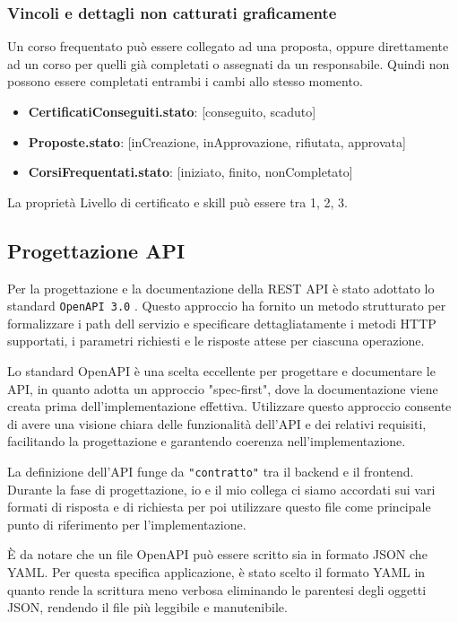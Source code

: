 \FloatBarrier

\subsubsection{Vincoli e dettagli non catturati graficamente}

Un corso frequentato può essere collegato ad una proposta, oppure direttamente ad un corso per quelli già completati o assegnati da un responsabile. Quindi non possono essere completati entrambi i cambi allo stesso momento.

\begin{itemize}
\item \textbf{CertificatiConseguiti.stato}: [conseguito, scaduto]
\item \textbf{Proposte.stato}: [inCreazione, inApprovazione, rifiutata, approvata]
\item \textbf{CorsiFrequentati.stato}: [iniziato, finito, nonCompletato]
\end{itemize}

La proprietà Livello di certificato e skill può essere tra 1, 2, 3.


\subsection{Progettazione API}
\label{openapi_spec}
Per la progettazione e la documentazione della REST API è stato adottato lo standard \texttt{OpenAPI 3.0} \cite{documentazioneOpenApi}. Questo approccio ha fornito un metodo strutturato per formalizzare i path dell servizio e specificare dettagliatamente i metodi HTTP supportati, i parametri richiesti e le risposte attese per ciascuna operazione.

Lo standard OpenAPI è una scelta eccellente per progettare e documentare le API, in quanto adotta un approccio "spec-first", dove la documentazione viene creata prima dell'implementazione effettiva. Utilizzare questo approccio consente di avere una visione chiara delle funzionalità dell'API e dei relativi requisiti, facilitando la progettazione e garantendo coerenza nell'implementazione.

La definizione dell'API funge da \texttt{"contratto"} tra il backend e il frontend. Durante la fase di progettazione, io e il mio collega ci siamo accordati sui vari formati di risposta e di richiesta per poi utilizzare questo file come principale punto di riferimento per l'implementazione.

È da notare che un file OpenAPI può essere scritto sia in formato JSON che YAML. Per questa specifica applicazione, è stato scelto il formato YAML in quanto rende la scrittura meno verbosa eliminando le parentesi degli oggetti JSON, rendendo il file più leggibile e manutenibile.


